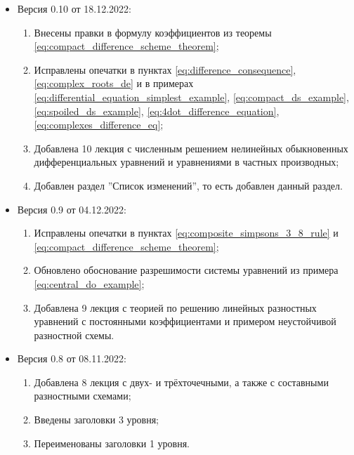 \documentclass{article}
\begin{document}
\begin{itemize}[nosep]
\item Версия 0.10 от 18.12.2022:
	\begin{enumerate}[nosep]
		\item Внесены правки в формулу коэффициентов из
			теоремы
			\eqref{eq:compact_difference_scheme_theorem};
		\item Исправлены опечатки в пунктах
			\eqref{eq:difference_consequence},
			\eqref{eq:complex_roots_de}
			и в примерах
			\eqref{eq:differential_equation_simplest_example},
			\eqref{eq:compact_ds_example},
			\eqref{eq:spoiled_ds_example},
			\eqref{eq:4dot_difference_equation},
			\eqref{eq:complexes_difference_eq};
		\item Добавлена 10 лекция с численным решением нелинейных
			обыкновенных дифференциальных уравнений и уравнениями
			в частных производных;
		\item Добавлен раздел ''Список изменений'', то есть добавлен
			данный раздел.
	\end{enumerate}

\item Версия 0.9 от 04.12.2022:
	\begin{enumerate}[nosep]
		\item Исправлены опечатки в пунктах
			\eqref{eq:composite_simpsons_3_8_rule} и
			\eqref{eq:compact_difference_scheme_theorem};
		\item Обновлено обоснование разрешимости системы уравнений из
			примера \eqref{eq:central_do_example};
		\item Добавлена 9 лекция с теорией по решению линейных
			разностных уравнений с постоянными коэффициентами и
			примером неустойчивой разностной схемы.
	\end{enumerate}

\item Версия 0.8 от 08.11.2022:
	\begin{enumerate}[nosep]
		\item Добавлена 8 лекция с двух- и трёхточечными, а также с
			составными разностными схемами;
		\item Введены заголовки 3 уровня;
		\item Переименованы заголовки 1 уровня.
	\end{enumerate}
\end{itemize}
\end{document}
